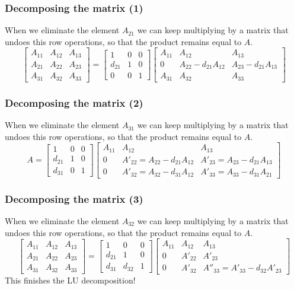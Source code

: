 \documentclass[11pt,table,final,xcolor={usenames,dvipsnames,table}]{beamer}
\begin{document}
\begin{frame}[fragile]
  \frametitle{Decomposing the matrix (1)}
  When we eliminate the element $A_{21}$ we can keep multiplying by a matrix that undoes this row operations, so that the product remains equal to $A$.
\[ 
\begin{bmatrix}
A_{11} & A_{12} & A_{13}\\ 
A_{21} & A_{22} & A_{23}\\ 
A_{31} & A_{32} & A_{33}
\end{bmatrix} = 
\begin{bmatrix}
1 & 0 & 0 \\
d_{21}& 1 & 0 \\
0 & 0 & 1
\end{bmatrix}
\begin{bmatrix}
A_{11} & A_{12} & A_{13}\\ 
0 & A_{22}-d_{21}A_{12} & A_{23}-d_{21}A_{13}\\ 
A_{31} & A_{32} & A_{33}
\end{bmatrix}
\]
\end{frame}

\begin{frame}[fragile]
  \frametitle{Decomposing the matrix (2)}
  When we eliminate the element $A_{31}$ we can keep multiplying by a matrix that undoes this row operations, so that the product remains equal to $A$.
\[ 
A = 
\begin{bmatrix}
1 & 0 & 0 \\
d_{21}& 1 & 0 \\
d_{31} & 0 & 1
\end{bmatrix}
\begin{bmatrix}
A_{11} & A_{12} & A_{13}\\ 
0 & A'_{22}=A_{22}-d_{21}A_{12} & A'_{23} = A_{23}-d_{21}A_{13}\\ 
0 & A'_{32} = A_{32}-d_{31}A_{12} & A'_{33} = A_{33}-d_{31}A_{21}
\end{bmatrix}
\]
\end{frame}

\begin{frame}[fragile]
  \frametitle{Decomposing the matrix (3)}
  When we eliminate the element $A_{32}$ we can keep multiplying by a matrix that undoes this row operations, so that the product remains equal to $A$.
\[ 
\begin{bmatrix}
A_{11} & A_{12} & A_{13}\\ 
A_{21} & A_{22} & A_{23}\\ 
A_{31} & A_{32} & A_{33}
\end{bmatrix} = 
\begin{bmatrix}
1 & 0 & 0 \\
d_{21}& 1 & 0 \\
d_{31} & d_{32} & 1
\end{bmatrix}
\begin{bmatrix}
A_{11} & A_{12} & A_{13}\\ 
0 & A'_{22} & A'_{23} \\ 
0 & A'_{32}  & A''_{33} = A'_{33}-d_{32}A'_{23}
\end{bmatrix}
\]\pause
This finishes the LU decomposition!
\end{frame}
\end{document}
